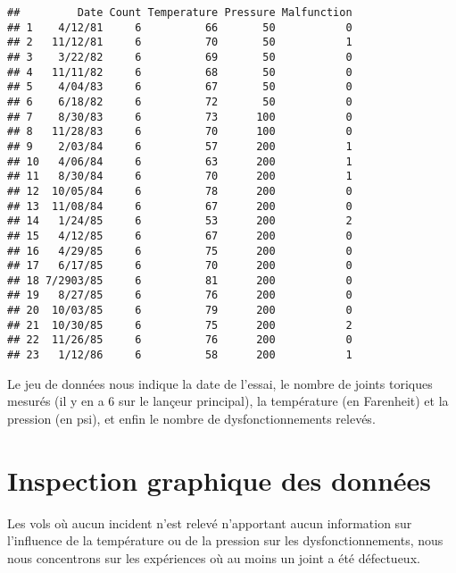 \documentclass[]{article}
\newenvironment{Shaded}{\begin{snugshade}}{\end{snugshade}}
\newcommand{\DecValTok}[1]{\textcolor[rgb]{0.00,0.00,0.81}{#1}}
\newcommand{\NormalTok}[1]{#1}
\newcommand{\OperatorTok}[1]{\textcolor[rgb]{0.81,0.36,0.00}{\textbf{#1}}}
\newcommand{\StringTok}[1]{\textcolor[rgb]{0.31,0.60,0.02}{#1}}
\begin{document}
\begin{verbatim}
##         Date Count Temperature Pressure Malfunction
## 1    4/12/81     6          66       50           0
## 2   11/12/81     6          70       50           1
## 3    3/22/82     6          69       50           0
## 4   11/11/82     6          68       50           0
## 5    4/04/83     6          67       50           0
## 6    6/18/82     6          72       50           0
## 7    8/30/83     6          73      100           0
## 8   11/28/83     6          70      100           0
## 9    2/03/84     6          57      200           1
## 10   4/06/84     6          63      200           1
## 11   8/30/84     6          70      200           1
## 12  10/05/84     6          78      200           0
## 13  11/08/84     6          67      200           0
## 14   1/24/85     6          53      200           2
## 15   4/12/85     6          67      200           0
## 16   4/29/85     6          75      200           0
## 17   6/17/85     6          70      200           0
## 18 7/2903/85     6          81      200           0
## 19   8/27/85     6          76      200           0
## 20  10/03/85     6          79      200           0
## 21  10/30/85     6          75      200           2
## 22  11/26/85     6          76      200           0
## 23   1/12/86     6          58      200           1
\end{verbatim}

Le jeu de données nous indique la date de l'essai, le nombre de joints
toriques mesurés (il y en a 6 sur le lançeur principal), la température
(en Farenheit) et la pression (en psi), et enfin le nombre de
dysfonctionnements relevés.

\hypertarget{inspection-graphique-des-donnees}{%
\section{Inspection graphique des
données}\label{inspection-graphique-des-donnees}}

Les vols où aucun incident n'est relevé n'apportant aucun information
sur l'influence de la température ou de la pression sur les
dysfonctionnements, nous nous concentrons sur les expériences où au
moins un joint a été défectueux.

\begin{Shaded}
\end{Shaded}
\end{document}
